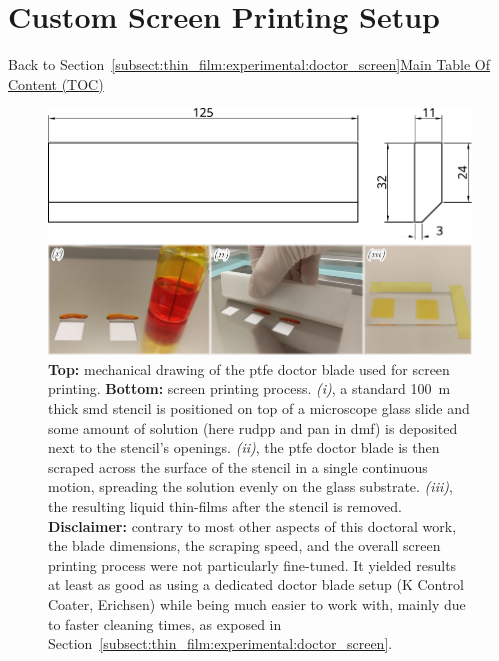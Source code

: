\chapter{Custom Screen Printing Setup}\label{app:screen_printing}

\begin{appbox}
	Back to Section~\ref{subsect:thin_film:experimental:doctor_screen}\hfill \hyperref[chapter:toc]{Main Table Of Content (TOC)}
\end{appbox}

\begin{figure}
	\centering
	\includegraphics{3_back_matter/figures/cale_ptfe_comp.pdf}
	\caption[Custom screen printing doctor blade and setup.]{\textbf{Top:} mechanical drawing of the \gls{ptfe} doctor blade used for screen printing. \textbf{Bottom:} screen printing process. \textit{(i)}, a standard 100~\textmu{}m thick \gls{smd} stencil is positioned on top of a microscope glass slide and some amount of solution (here \gls{rudpp} and \gls{pan} in \gls{dmf}) is deposited next to the stencil's openings. \textit{(ii)}, the \gls{ptfe} doctor blade is then scraped across the surface of the stencil in a single continuous motion, spreading the solution evenly on the glass substrate. \textit{(iii)}, the resulting liquid thin-films after the stencil is removed.\\\textbf{Disclaimer:} contrary to most other aspects of this doctoral work, the blade dimensions, the scraping speed, and the overall screen printing process were not particularly fine-tuned. It yielded results at least as good as using a dedicated doctor blade setup (K Control Coater, Erichsen) while being much easier to work with, mainly due to faster cleaning times, as exposed in Section~\ref{subsect:thin_film:experimental:doctor_screen}.}
\end{figure}
